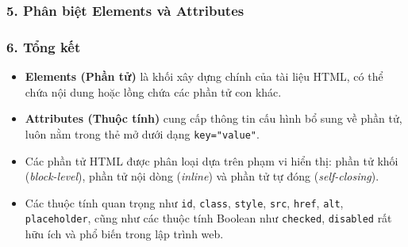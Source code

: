 \documentclass[11pt,oneside]{book}
\newcommand{\thd}[1]{\textcolor{white}{\textbf{\strut #1}}}
\newcommand{\codeinline}[1]{\textcolor{accentOrange}{\texttt{#1}}}
\begin{document}
\subsubsection{5. Phân biệt Elements và Attributes}

\begin{prettyTableBox}
\end{prettyTableBox}

\subsubsection{6. Tổng kết}

\begin{noteBox}
\begin{itemize}[leftmargin=1.8em, itemsep=3pt, parsep=0pt]
    \item \textbf{Elements (Phần tử)} là khối xây dựng chính của tài liệu HTML, có thể chứa nội dung hoặc lồng chứa các phần tử con khác.
    \item \textbf{Attributes (Thuộc tính)} cung cấp thông tin cấu hình bổ sung về phần tử, luôn nằm trong thẻ mở dưới dạng \codeinline{key="value"}.
    \item Các phần tử HTML được phân loại dựa trên phạm vi hiển thị: phần tử khối (\textit{block-level}), phần tử nội dòng (\textit{inline}) và phần tử tự đóng (\textit{self-closing}).
    \item Các thuộc tính quan trọng như \codeinline{id}, \codeinline{class}, \codeinline{style}, \codeinline{src}, \codeinline{href}, \codeinline{alt}, \codeinline{placeholder}, cũng như các thuộc tính Boolean như \codeinline{checked}, \codeinline{disabled} rất hữu ích và phổ biến trong lập trình web.
\end{itemize}
\end{noteBox}
\end{document}
